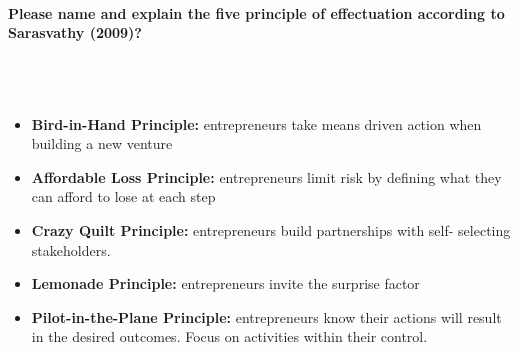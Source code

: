 \documentclass[10pt,a4paper,noendnumber=true]{scrartcl}
\newcommand{\properparagraph}[1]{\paragraph{\textcolor{Emerald}{#1}}\mbox{}\\}
\begin{document}
\properparagraph{Please name and explain the five principle of effectuation according to Sarasvathy (2009)?}
\\[-6ex]
\begin{itemize}
	\item \textbf{Bird-in-Hand Principle:} entrepreneurs take means driven action when building a new venture
	\item \textbf{Affordable Loss Principle:} entrepreneurs limit risk by defining what they can afford to lose at each step
	\item \textbf{Crazy Quilt Principle:} entrepreneurs	build partnerships with self-
	selecting stakeholders.	
	\item \textbf{Lemonade Principle:} entrepreneurs invite the surprise factor
	\item \textbf{Pilot-in-the-Plane Principle:} entrepreneurs know their actions will result in the desired outcomes. Focus on activities within their control.	
\end{itemize}
\end{document}
